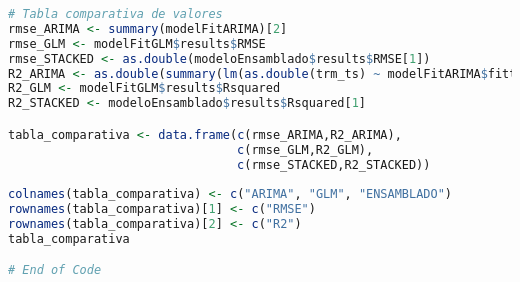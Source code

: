 \begin{lstlisting}[language=R]
# Tabla comparativa de valores
rmse_ARIMA <- summary(modelFitARIMA)[2]
rmse_GLM <- modelFitGLM$results$RMSE
rmse_STACKED <- as.double(modeloEnsamblado$results$RMSE[1])
R2_ARIMA <- as.double(summary(lm(as.double(trm_ts) ~ modelFitARIMA$fitted))[8])
R2_GLM <- modelFitGLM$results$Rsquared
R2_STACKED <- modeloEnsamblado$results$Rsquared[1]

tabla_comparativa <- data.frame(c(rmse_ARIMA,R2_ARIMA),
                                c(rmse_GLM,R2_GLM),
                                c(rmse_STACKED,R2_STACKED))
  
colnames(tabla_comparativa) <- c("ARIMA", "GLM", "ENSAMBLADO")
rownames(tabla_comparativa)[1] <- c("RMSE")
rownames(tabla_comparativa)[2] <- c("R2")
tabla_comparativa

# End of Code
\end{lstlisting}

